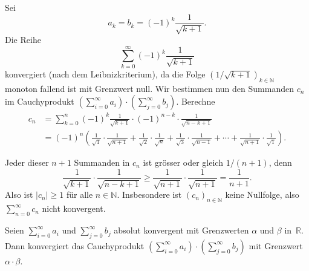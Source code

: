 \documentclass[../main.tex]{subfiles}
\begin{document}
\begin{example}
  Sei 
  \[
    a_k = b_k = {(-1)}^k \frac{1}{\sqrt{k+1}}.
  \]
  Die Reihe
  \[
    \sum_{k=0}^{\infty} {(-1)}^k \frac{1}{\sqrt{k+1}}
  \]
  konvergiert (nach dem Leibnizkriterium),
  da die Folge ${(1/\sqrt{k+1})}_{k \in \mathbb{N}}$
  monoton fallend ist mit Grenzwert null.
  Wir bestimmen nun den Summanden $c_n$ im
  Cauchyprodukt
  $\left( \sum_{i=0}^{\infty} a_i \right) \cdot
  \left( \sum_{j=0}^{\infty} b_j \right)$.
  Berechne
  \begin{align*}
    c_n & = \sum_{k=0}^{n} {(-1)}^k \frac{1}{\sqrt{k+1}}
    \cdot {(-1)}^{n-k} \cdot \frac{1}{\sqrt{n-k+1}} \\
        &=
    (-1)^n \left(  
      \frac{1}{\sqrt 1} \cdot \frac{1}{\sqrt{n+1}}
      + \frac{1}{\sqrt 2} \cdot \frac{1}{\sqrt n}
      + \frac{1}{\sqrt 3} \cdot \frac{1}{\sqrt{n-1}}
      + \cdots
      + \frac{1}{\sqrt{n+1}} \cdot \frac{1}{\sqrt 1}
    \right).
  \end{align*}
\end{example}
Jeder dieser $n + 1$ Summanden in $c_n$ ist grösser oder
gleich $1/(n+1)$, denn
\[
  \frac{1}{\sqrt{k+1}}\cdot\frac{1}{\sqrt{n-k+1}}
  \geq \frac{1}{\sqrt{n+1}} \cdot \frac{1}{\sqrt{n+1}}
  = \frac{1}{n+1}.
\]
Also ist $|c_n| \geq 1$ für alle $n \in \mathbb{N}$.
Insbesondere ist ${(c_{n})}_{n \in \mathbb{N}}$ 
keine Nullfolge,
also $\sum_{n=0}^{\infty} c_n$ nicht konvergent.

\begin{theorem}\label{thm:cauchy-product}
  Seien
  $\sum_{i=0}^{\infty} a_i$ und $\sum_{j=0}^{\infty} b_j$ 
  absolut konvergent mit Grenzwerten $\alpha$ und $\beta$ 
  in~$\mathbb{R}$.
  Dann konvergiert das Cauchyprodukt
  $\left( \sum_{i=0}^{\infty} a_i \right) \cdot
  \left( \sum_{j=0}^{\infty} b_j \right)$ mit
  Grenzwert $\alpha \cdot \beta$.
\end{theorem}

\end{document}
